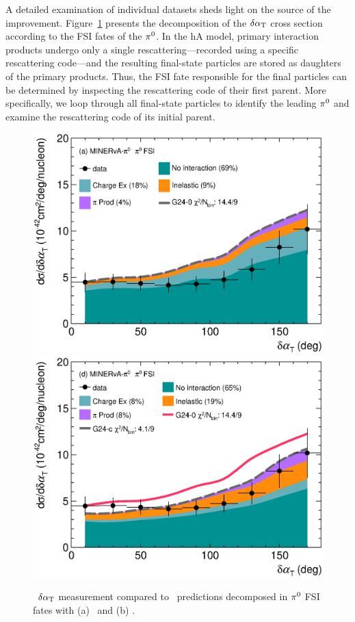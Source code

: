     A detailed examination of individual datasets sheds light on the source of the improvement. 
    Figure~\ref{fig:CEX-minpiz-dat-pi0} presents the decomposition of the $\delta\alpha_\textrm{T}$ cross section according to the FSI fates of the $\pi^0$. 
    In the hA model, primary interaction products undergo only a single rescattering—recorded using a specific rescattering code—and the resulting final-state particles are stored as daughters of the primary products. 
    Thus, the FSI fate responsible for the final particles can be determined by inspecting the rescattering code of their first parent. 
    More specifically, we loop through all final-state particles to identify the leading $\pi^0$ and examine the rescattering code of its initial parent. 
    \begin{figure}[!htb] 	
        \centering 		
        \includegraphics[width=\dbfigwid\textwidth]{figures/tuning/0000-min_pi0_dalphat_pi0_decomp_cex.eps}
        \includegraphics[width=\dbfigwid\textwidth]{figures/tuning/0026-min_pi0_dalphat_pi0_decomp_covfix.eps}	
        \caption{\label{fig:CEX-minpiz-dat-pi0} \minpiz\ $\delta\alpha_\textrm{T}$ measurement compared to \genie\ predictions decomposed in $\pi^0$ FSI fates with (a) \gZero\ and (b) \gC.} 
    \end{figure}

